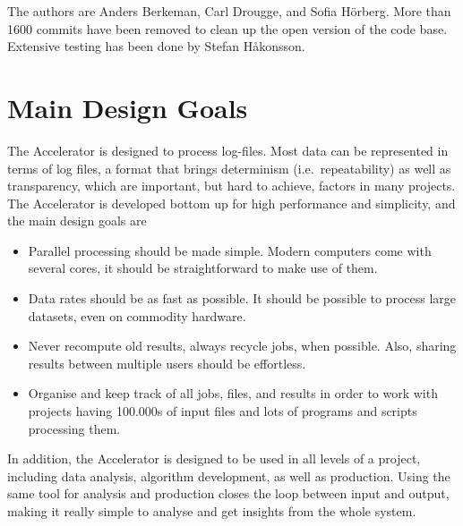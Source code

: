 The authors are Anders Berkeman, Carl Drougge, and Sofia H\"orberg.
More than 1600 commits have been removed to clean up the open version
of the code base.  Extensive testing has been done by Stefan
H{\aa}konsson.


\section{Main Design Goals}
The Accelerator is designed to process log-files.  Most data can be
represented in terms of log files, a format that brings determinism
(i.e.\ repeatability) as well as transparency, which are important,
but hard to achieve, factors in many projects.  The Accelerator is
developed bottom up for high performance and simplicity, and the main
design goals are
\begin{itemize}

\item[] Parallel processing should be made simple.  Modern computers
  come with several cores, it should be straightforward to make use of
  them.

\item[] Data rates should be as fast as possible.  It should be
  possible to process large datasets, even on commodity hardware.

\item[] Never recompute old results, always recycle jobs, when
  possible.  Also, sharing results between multiple users should be
  effortless.

\item[] Organise and keep track of all jobs, files, and results in
  order to work with projects having 100.000s of input files and lots
  of programs and scripts processing them.
  
\end{itemize}
In addition, the Accelerator is designed to be used in all levels of a
project, including data analysis, algorithm development, as well as
production.  Using the same tool for analysis and production closes
the loop between input and output, making it really simple to analyse
and get insights from the whole system.



